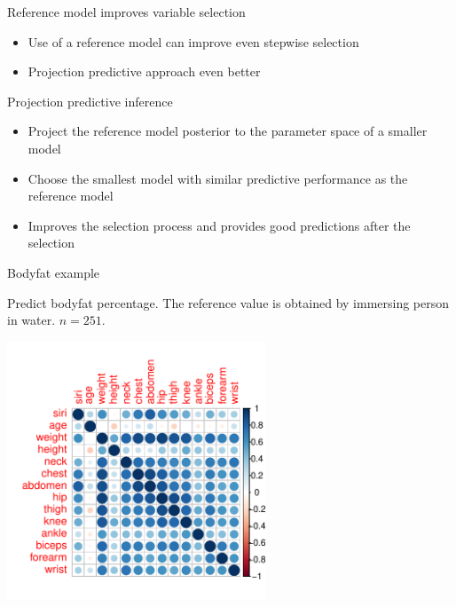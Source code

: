 \documentclass[english,t]{beamer}
\begin{document}
\begin{frame}{Reference model improves variable selection}

  \begin{itemize}
  \item Use of a reference model can improve even stepwise selection
  \item Projection predictive approach even better
  \end{itemize}

\end{frame}

\begin{frame}{Projection predictive inference}

  \begin{itemize}
  \item Project the reference model posterior to the parameter space
    of a smaller model
  \item Choose the smallest model with similar predictive performance
    as the reference model
  \item<2-> Improves the selection process and provides good predictions
    after the selection
  \end{itemize}

\end{frame}

\begin{frame}{Bodyfat example}

  \vspace{-0.55\baselineskip}
  Predict bodyfat percentage. The reference value is obtained by
  immersing person in water. $n=251$.

  \pause
  \vspace{-0.7\baselineskip}
  \includegraphics[width=7.7cm]{bodyfat_corr.pdf}

\end{frame}
\end{document}

